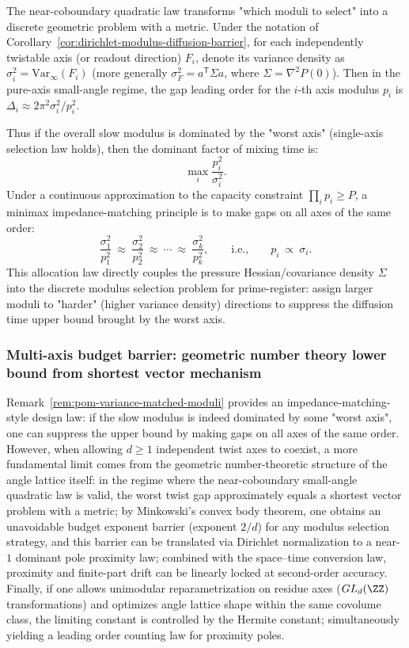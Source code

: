 \begin{remark}\label{rem:pom-variance-matched-moduli}
The near-coboundary quadratic law transforms "which moduli to select" into a discrete geometric problem with a metric.
Under the notation of Corollary~\ref{cor:dirichlet-modulus-diffusion-barrier}, for each independently twistable axis (or readout direction) $F_i$, denote its variance density as $\sigma_i^2=\mathrm{Var}_\infty(F_i)$ (more generally $\sigma_F^2=a^{\mathsf T}\Sigma a$, where $\Sigma=\nabla^2P(0)$).
Then in the pure-axis small-angle regime, the gap leading order for the $i$-th axis modulus $p_i$ is $\Delta_i\approx 2\pi^2\sigma_i^2/p_i^2$.
\par
Thus if the overall slow modulus is dominated by the "worst axis" (single-axis selection law holds), then the dominant factor of mixing time is:
\[
\max_i\frac{p_i^2}{\sigma_i^2}.
\]
Under a continuous approximation to the capacity constraint $\prod_i p_i\ge P$, a minimax impedance-matching principle is to make gaps on all axes of the same order:
\[
\frac{\sigma_1^2}{p_1^2}\ \approx\ \frac{\sigma_2^2}{p_2^2}\ \approx\ \cdots\ \approx\ \frac{\sigma_k^2}{p_k^2},
\qquad\text{i.e.,}\qquad
p_i\ \propto\ \sigma_i.
\]
This allocation law directly couples the pressure Hessian/covariance density $\Sigma$ into the discrete modulus selection problem for prime-register: assign larger moduli to "harder" (higher variance density) directions to suppress the diffusion time upper bound brought by the worst axis.
\end{remark}

\subsubsection{Multi-axis budget barrier: geometric number theory lower bound from shortest vector mechanism}\label{subsubsec:pom-multi-axis-budget-barrier}
Remark~\ref{rem:pom-variance-matched-moduli} provides an impedance-matching-style design law: if the slow modulus is indeed dominated by some "worst axis", one can suppress the upper bound by making gaps on all axes of the same order.
However, when allowing $d\ge 1$ independent twist axes to coexist, a more fundamental limit comes from the geometric number-theoretic structure of the angle lattice itself: in the regime where the near-coboundary small-angle quadratic law is valid, the worst twist gap approximately equals a shortest vector problem with a metric;
by Minkowski's convex body theorem, one obtains an unavoidable budget exponent barrier (exponent $2/d$) for any modulus selection strategy, and this barrier can be translated via Dirichlet normalization to a near-$1$ dominant pole proximity law; combined with the space–time conversion law, proximity and finite-part drift can be linearly locked at second-order accuracy.
Finally, if one allows unimodular reparametrization on residue axes ($GL_d(\ZZ)$ transformations) and optimizes angle lattice shape within the same covolume class, the limiting constant is controlled by the Hermite constant; simultaneously yielding a leading order counting law for proximity poles.

